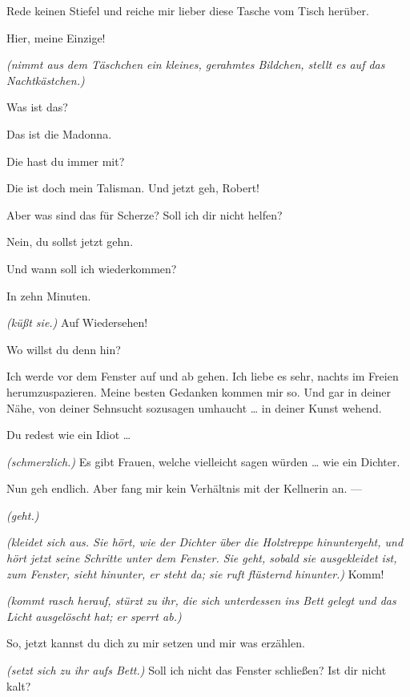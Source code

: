 \documentclass[
	final,
	a4paper,
	ngerman,
	mpinclude = true, %
	twoside = true,
	open = right,
	cleardoublepage = plain,
	DIV = 13,
	BCOR = 1cm,
	titlepage = firstiscover,
	]{scrbook}
\newcommand{\direction}[1]{\textit{(#1)}}
\newcommand{\thecharacter}[1]{\textup{\textsc{#1}}\xspace}
\newcommand{\thedichter}{\thecharacter{Dichter}}
\newcommand{\theschauspielerin}{\thecharacter{Schauspielerin}}
\newcommand{\character}[1]{\item[#1:]}
\newcommand{\dichter}{\character{\thedichter}}
\newcommand{\schauspielerin}{\character{\theschauspielerin}}
\begin{document}
\begin{play}
	\schauspielerin
	Rede keinen Stiefel und reiche mir lieber diese Tasche vom Tisch herüber.

	\dichter
	Hier, meine Einzige!

	\schauspielerin
	\direction{nimmt aus dem Täschchen ein kleines, gerahmtes Bildchen, stellt es auf das Nachtkästchen.}

	\dichter
	Was ist das?

	\schauspielerin
	Das ist die Madonna.

	\dichter
	Die hast du immer mit?

	\schauspielerin
	Die ist doch mein Talisman. Und jetzt geh, Robert!

	\dichter
	Aber was sind das für Scherze? Soll ich dir nicht helfen?

	\schauspielerin
	Nein, du sollst jetzt gehn.

	\dichter
	Und wann soll ich wiederkommen?

	\schauspielerin
	In zehn Minuten.

	\dichter
	\direction{küßt sie.} Auf Wiedersehen!

	\schauspielerin
	Wo willst du denn hin?

	\dichter
	Ich werde vor dem Fenster auf und ab gehen. Ich liebe es sehr, nachts im Freien herumzuspazieren. Meine besten Gedanken kommen mir so. Und gar in deiner Nähe, von deiner Sehnsucht sozusagen umhaucht \ldots{} in deiner Kunst wehend.

	\schauspielerin
	Du redest wie ein Idiot \ldots{}

	\dichter
	\direction{schmerzlich.} Es gibt Frauen, welche vielleicht sagen würden \ldots{} wie ein Dichter.

	\schauspielerin
	Nun geh endlich. Aber fang mir kein Verhältnis mit der Kellnerin an. ---

	\dichter
	\direction{geht.}

	\schauspielerin
	\direction{kleidet sich aus. Sie hört, wie der Dichter über die Holztreppe hinuntergeht, und hört jetzt seine Schritte unter dem Fenster. Sie geht, sobald sie ausgekleidet ist, zum Fenster, sieht hinunter, er steht da; sie ruft flüsternd hinunter.} Komm!

	\dichter
	\direction{kommt rasch herauf, stürzt zu ihr, die sich unterdessen ins Bett gelegt und das Licht ausgelöscht hat; er sperrt ab.}

	\schauspielerin
	So, jetzt kannst du dich zu mir setzen und mir was erzählen.

	\dichter
	\direction{setzt sich zu ihr aufs Bett.} Soll ich nicht das Fenster schließen? Ist dir nicht kalt?


\end{play}
\end{document}
